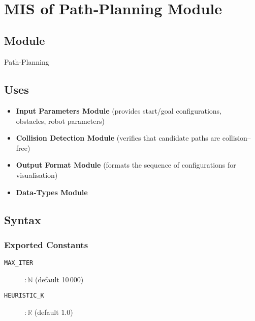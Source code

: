 \documentclass[12pt, titlepage]{article}
\begin{document}
\newpage
~\newpage


\section{MIS of Path‑Planning Module}
\label{mod:pathplanning}

\subsection{Module}
Path‑Planning

\subsection{Uses}
\begin{itemize}
  \item \textbf{Input Parameters Module} (provides start/goal configurations,\\
        \hspace*{1.8em}\;obstacles, robot parameters)
  \item \textbf{Collision Detection Module} (verifies that candidate paths are collision–free)
  \item \textbf{Output Format Module} (formats the sequence of configurations for visualisation)
  \item \textbf{Data‑Types Module} 
\end{itemize}

\subsection{Syntax}


\subsubsection{Exported Constants}
\begin{description}
  \item[\texttt{MAX\_ITER}] $\!:\! \mathbb{N}$ \hfill (default 10\,000)
  \item[\texttt{HEURISTIC\_K}] $\!:\! \mathbb{R}$ \hfill (default $1.0$)
\end{description}
\end{document}
